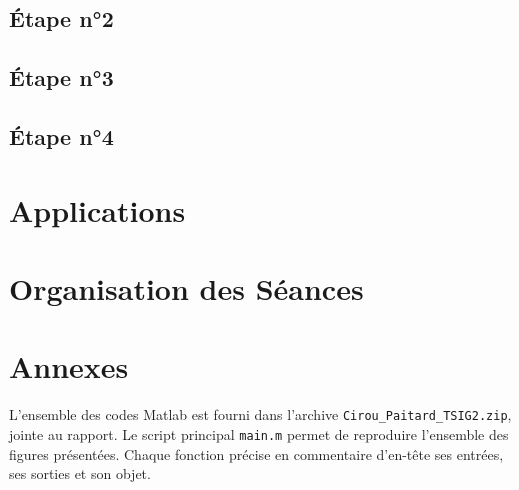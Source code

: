\documentclass[11pt,a4paper]{article}
\begin{document}
\subsection{Étape n°2}

\subsection{Étape n°3}

\subsection{Étape n°4}

\section{Applications}


\section{Organisation des Séances}

\section{Annexes}

L'ensemble des codes Matlab est fourni dans l'archive
\texttt{Cirou\_Paitard\_TSIG2.zip}, jointe au rapport. Le script principal
\texttt{main.m} permet de reproduire l'ensemble des figures présentées. Chaque fonction
précise en commentaire d'en-tête ses entrées, ses sorties et son objet.
\end{document}
